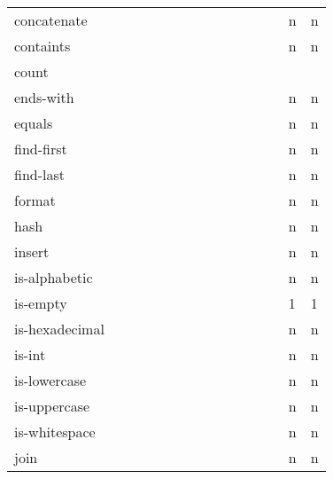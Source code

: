 \documentclass[anonymous,sigplan,review,11pt,nonacm,natbib=false]{acmart}
\begin{document}
\begin{table*}
\begin{tabular}{lllllllllllllll}
            concatenate &  &  &  &  &  &  &  &  &  &  &  &  & n & n \\

            containts &  &  &  &  &  &  &  &  &  &  &  &  & n & n \\

            count &  &  &  &  &  &  &  &  &  &  &  &  &  & \\

            ends-with &  &  &  &  &  &  &  &  &  &  &  &  & n & n \\

            equals &  &  &  &  &  &  &  &  &  &  &  &  & n & n \\

            find-first &  &  &  &  &  &  &  &  &  &  &  &  & n & n \\

            find-last &  &  &  &  &  &  &  &  &  &  &  &  & n & n \\

            format &  &  &  &  &  &  &  &  &  &  &  &  & n & n \\

            hash &  &  &  &  &  &  &  &  &  &  &  &  & n & n \\

            insert &  &  &  &  &  &  &  &  &  &  &  &  & n & n \\

            is-alphabetic &  &  &  &  &  &  &  &  &  &  &  &  & n & n \\

            is-empty &  &  &  &  &  &  &  &  &  &  &  &  & 1 & 1 \\

            is-hexadecimal &  &  &  &  &  &  &  &  &  &  &  &  & n & n \\

            is-int &  &  &  &  &  &  &  &  &  &  &  &  & n & n \\

            is-lowercase &  &  &  &  &  &  &  &  &  &  &  &  & n & n \\

            is-uppercase &  &  &  &  &  &  &  &  &  &  &  &  & n & n \\

            is-whitespace &  &  &  &  &  &  &  &  &  &  &  &  & n & n \\

            join &  &  &  &  &  &  &  &  &  &  &  &  & n & n \\


\end{tabular}
\end{table*}
\end{document}
